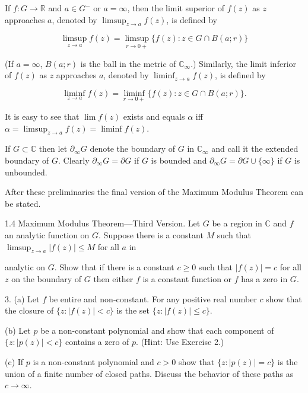 If $f: G \to \mathbb{R}$ and $a \in G^{-}$ or $a = \infty$, then the limit superior of $f(z)$ as $z$ approaches $a$, denoted by $\limsup_{z \to a} f(z)$, is defined by

$$\limsup_{z \to a} f(z) = \limsup_{r \to 0+} \{ f(z): z \in G \cap B(a; r) \}$$

(If $a = \infty$, $B(a; r)$ is the ball in the metric of $\mathbb{C}_{\infty}$.) Similarly, the limit inferior of $f(z)$ as $z$ approaches $a$, denoted by $\liminf_{z \to a} f(z)$, is defined by

$$\liminf_{z \to a} f(z) = \liminf_{r \to 0+} \{ f(z): z \in G \cap B(a; r) \}.$$

It is easy to see that $\lim f(z)$ exists and equals $\alpha$ iff $\alpha = \limsup_{z \to a} f(z) = \liminf f(z)$.

If $G \subset \mathbb{C}$ then let $\partial_{\infty} G$ denote the boundary of $G$ in $\mathbb{C}_{\infty}$ and call it the extended boundary of $G$. Clearly $\partial_{\infty} G = \partial G$ if $G$ is bounded and $\partial_{\infty} G = \partial G \cup \{\infty\}$ if $G$ is unbounded.

After these preliminaries the final version of the Maximum Modulus Theorem can be stated.

1.4 Maximum Modulus Theorem—Third Version. Let $G$ be a region in $\mathbb{C}$ and $f$ an analytic function on $G$. Suppose there is a constant $M$ such that $\limsup_{z \to a} |f(z)| \leq M$ for all $a$ in

analytic on $G$. Show that if there is a constant $c \geq 0$ such that $|f(z)| = c$ for all $z$ on the boundary of $G$ then either $f$ is a constant function or $f$ has a zero in $G$.

3. (a) Let $f$ be entire and non-constant. For any positive real number $c$ show that the closure of $\{z: |f(z)| < c\}$ is the set $\{z: |f(z)| \leq c\}$.

(b) Let $p$ be a non-constant polynomial and show that each component of $\{z: |p(z)| < c\}$ contains a zero of $p$. (Hint: Use Exercise 2.)

(c) If $p$ is a non-constant polynomial and $c > 0$ show that $\{z: |p(z)| = c\}$ is the union of a finite number of closed paths. Discuss the behavior of these paths as $c \to \infty$.